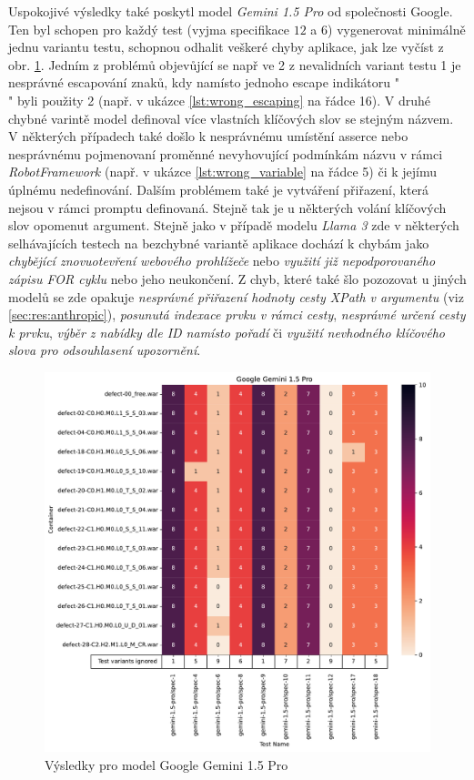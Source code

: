 \documentclass[czech, ma, kiv, he, iso690numb, pdf, viewonly]{fasthesis}
\begin{document}
            Uspokojivé výsledky také poskytl model \textit{Gemini 1.5 Pro} od společnosti Google. Ten byl schopen pro každý test (vyjma specifikace \(12\) a \(6\)) vygenerovat minimálně jednu variantu testu, schopnou odhalit veškeré chyby aplikace, jak lze vyčíst z obr. \ref{fig:res:gemini}. Jedním z problémů objevůjící se např ve 2 z nevalidních variant testu 1 je nesprávné escapování znaků, kdy namísto jednoho escape indikátoru "\\" byli použity 2 (např. v ukázce \ref{lst:wrong_escaping} na řádce 16). V druhé chybné varintě model definoval více vlastních klíčových slov se stejným názvem. V některých případech také došlo k nesprávnému umístění asserce nebo nesprávnému pojmenovaní proměnné nevyhovující podmínkám názvu v rámci \textit{RobotFramework} (např. v ukázce \ref{lst:wrong_variable} na řádce 5) či k jejímu úplnému nedefinování. Dalším problémem také je vytváření přiřazení, která nejsou v rámci promptu definovaná. Stejně tak je u některých volání klíčových slov opomenut argument. Stejně jako v případě modelu \textit{Llama 3} zde v některých selhávajících testech na bezchybné variantě aplikace dochází k chybám jako \textit{chybějící znovuotevření webového prohlížeče} nebo \textit{využití již nepodporovaného zápisu FOR cyklu} nebo jeho neukončení. Z chyb, které také šlo pozozovat u jiných modelů se zde opakuje \textit{nesprávné přiřazení hodnoty cesty XPath v argumentu} (viz \ref{sec:res:anthropic}), \textit{posunutá indexace prvku v rámci cesty}, \textit{nesprávné určení cesty k prvku}, \textit{výběr z nabídky dle ID namísto pořadí} či \textit{využití nevhodného klíčového slova pro odsouhlasení upozornění}.

            \begin{figure}
                \includegraphics[width=\textwidth]{pic/gemini-results.pdf}
                \caption{Výsledky pro model Google Gemini 1.5 Pro}
                \label{fig:res:gemini}
            \end{figure}
\end{document}
